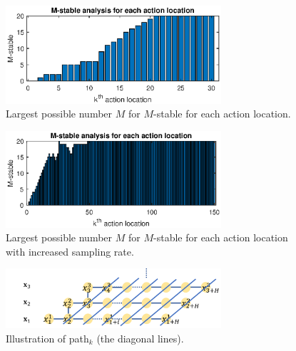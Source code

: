 \documentclass{ifacconf}
\begin{document}

\begin{figure}[htbp]
\begin{center}
\includegraphics[width=8cm]{plot/1_2.eps}
\caption{Largest possible number $M$ for $M$-stable for each action location.}
\label{fig:1_3}
\end{center}
\end{figure}



\begin{figure}[htbp]
\begin{center}
\includegraphics[width=8cm]{plot/1_4.eps}
\caption{Largest possible number $M$ for $M$-stable for each action location with increased sampling rate.}
\label{fig:1_4}
\end{center}
\end{figure}



\begin{figure}[htbp]
\begin{center}
\includegraphics[width=8cm]{src/1_3_path.png}
\caption{Illustration of path$_k$ (the diagonal lines).}
\label{fig:cost1}
\end{center}
\end{figure}
\end{document}
